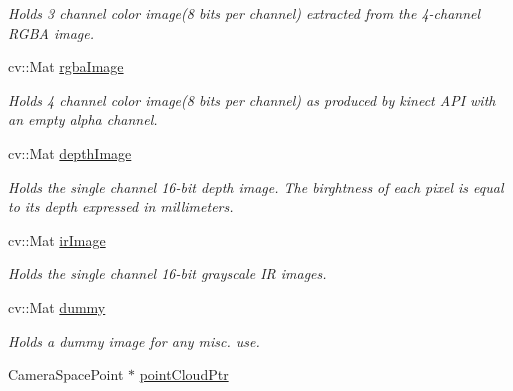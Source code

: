 \begin{DoxyCompactItemize}
\begin{DoxyCompactList}\small\item\em Holds 3 channel color image(8 bits per channel) extracted from the 4-\/channel R\+G\+B\+A image. \end{DoxyCompactList}\item 
\hypertarget{classpersonal_robotics_1_1_kinect_reader_a57e3ccdf857990fca134a3c01898ceb7}{}cv\+::\+Mat \hyperlink{classpersonal_robotics_1_1_kinect_reader_a57e3ccdf857990fca134a3c01898ceb7}{rgba\+Image}\label{classpersonal_robotics_1_1_kinect_reader_a57e3ccdf857990fca134a3c01898ceb7}

\begin{DoxyCompactList}\small\item\em Holds 4 channel color image(8 bits per channel) as produced by kinect A\+P\+I with an empty alpha channel. \end{DoxyCompactList}\item 
\hypertarget{classpersonal_robotics_1_1_kinect_reader_a4bfa3f18889f77253a76ecd2a6999e60}{}cv\+::\+Mat \hyperlink{classpersonal_robotics_1_1_kinect_reader_a4bfa3f18889f77253a76ecd2a6999e60}{depth\+Image}\label{classpersonal_robotics_1_1_kinect_reader_a4bfa3f18889f77253a76ecd2a6999e60}

\begin{DoxyCompactList}\small\item\em Holds the single channel 16-\/bit depth image. The birghtness of each pixel is equal to its depth expressed in millimeters. \end{DoxyCompactList}\item 
\hypertarget{classpersonal_robotics_1_1_kinect_reader_af191fde626809b8b09fd062de68df184}{}cv\+::\+Mat \hyperlink{classpersonal_robotics_1_1_kinect_reader_af191fde626809b8b09fd062de68df184}{ir\+Image}\label{classpersonal_robotics_1_1_kinect_reader_af191fde626809b8b09fd062de68df184}

\begin{DoxyCompactList}\small\item\em Holds the single channel 16-\/bit grayscale I\+R images. \end{DoxyCompactList}\item 
\hypertarget{classpersonal_robotics_1_1_kinect_reader_a0811f6812e14b90923377cc165e267d4}{}cv\+::\+Mat \hyperlink{classpersonal_robotics_1_1_kinect_reader_a0811f6812e14b90923377cc165e267d4}{dummy}\label{classpersonal_robotics_1_1_kinect_reader_a0811f6812e14b90923377cc165e267d4}

\begin{DoxyCompactList}\small\item\em Holds a dummy image for any misc. use. \end{DoxyCompactList}\item 
\hypertarget{classpersonal_robotics_1_1_kinect_reader_a0340f3ac6506c0205420120ba60f6614}{}Camera\+Space\+Point $\ast$ \hyperlink{classpersonal_robotics_1_1_kinect_reader_a0340f3ac6506c0205420120ba60f6614}{point\+Cloud\+Ptr}\label{classpersonal_robotics_1_1_kinect_reader_a0340f3ac6506c0205420120ba60f6614}


\end{DoxyCompactItemize}
